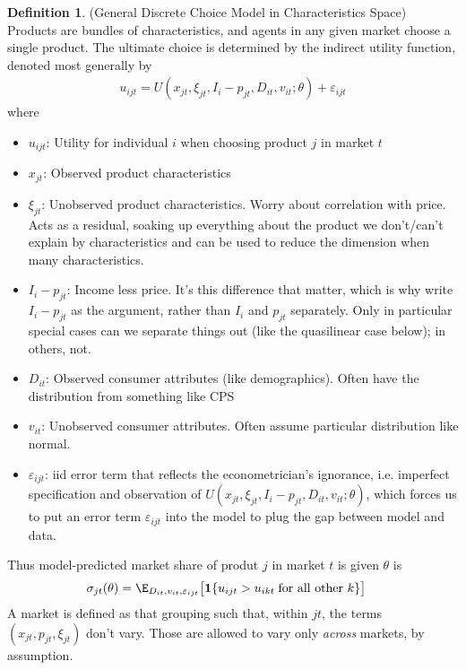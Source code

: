 \documentclass[12pt]{article}
\theoremstyle{plain}
\theoremstyle{definition}
\newtheorem{defn}[thm]{Definition}
\theoremstyle{remark}
\begin{document}
\clearpage
\begin{defn}
(General Discrete Choice Model in Characteristics Space)
Products are bundles of characteristics, and agents in any given market
choose a single product.
The ultimate choice is determined by the indirect utility function,
denoted most generally by
\begin{align*}
  u_{ijt}
  =
  U(x_{jt},\xi_{jt},I_i-p_{jt},D_{it},v_{it};\theta)
  + \varepsilon_{ijt}
\end{align*}
where
\begin{itemize}
  \item $u_{ijt}$:
    Utility for individual $i$ when choosing product $j$
    in market $t$
  \item $x_{jt}$: Observed product characteristics
  \item $\xi_{jt}$: Unobserved product characteristics.
    Worry about correlation with price.
    Acts as a residual, soaking up everything about the product we
    don't/can't explain by characteristics and can be used to reduce the
    dimension when many characteristics.
  \item $I_i-p_{jt}$: Income less price. It's this difference that
    matter, which is why write $I_i-p_{jt}$ as the argument, rather than
    $I_i$ and $p_{jt}$ separately. Only in particular special cases can
    we separate things out (like the quasilinear case below); in others,
    not.
  \item $D_{it}$: Observed consumer attributes (like demographics).
    Often have the distribution from something like CPS
  \item $v_{it}$: Unobserved consumer attributes.
    Often assume particular distribution like normal.
  \item $\varepsilon_{ijt}$: iid error term that reflects the
    econometrician's ignorance, i.e. imperfect specification and
    observation of
    $U(x_{jt},\xi_{jt},I_i-p_{jt},D_{it},v_{it};\theta)$,
    which forces us to put an error term $\varepsilon_{ijt}$ into the
    model to plug the gap between model and data.
\end{itemize}
Thus model-predicted market share of produt $j$ in market $t$ is given
$\theta$ is
\begin{align*}
  \sigma_{jt}(\theta)
  &=
  \E_{D_{it},v_{it},\varepsilon_{ijt}}
  \big[
    \mathbf{1}\{u_{ijt}>u_{ikt}\;\text{for all other $k$}\}
  \big]
\end{align*}
A market is defined as that grouping such that, within $jt$, the terms
$(x_{jt},p_{jt},\xi_{jt})$ don't vary.
Those are allowed to vary only \emph{across} markets, by assumption.
\end{defn}
\end{document}
